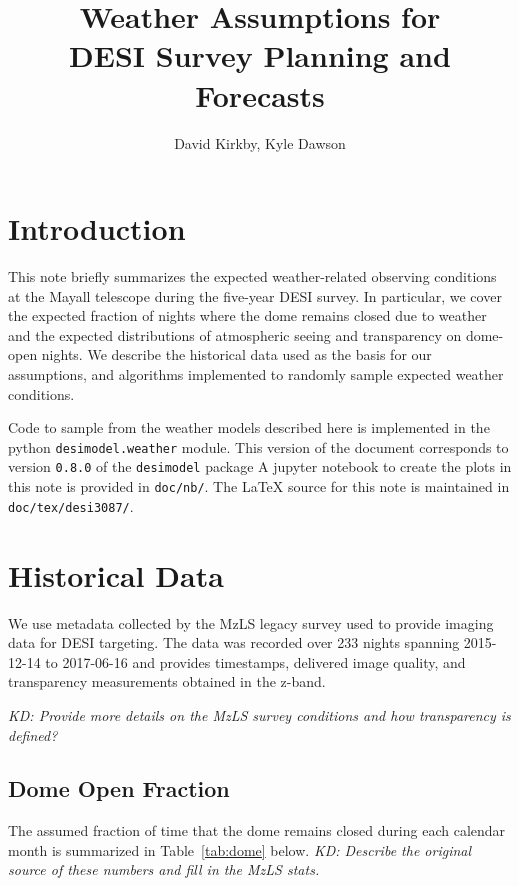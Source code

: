 \documentclass[12pt]{article}
\title{Weather Assumptions for\\
DESI Survey Planning and Forecasts\\
\vspace{5mm}{\large\bf DESI-doc-3087-v1}}
\author{David Kirkby, Kyle Dawson}
\providecommand{\tab}[1]{Table~\ref{tab:#1}}
\begin{document}
\maketitle

\section{Introduction}

This note briefly summarizes the expected weather-related observing conditions at the Mayall telescope during the five-year DESI survey.  In particular, we cover the expected fraction of nights where the dome remains closed due to weather and the expected distributions of atmospheric seeing and transparency on dome-open nights.  We describe the historical data used as the basis for our assumptions, and algorithms implemented to randomly sample expected weather conditions.

Code to sample from the weather models described here is implemented in the
python {\tt desimodel.weather} module.  This version of the document corresponds
to version {\tt 0.8.0} of the {\tt desimodel} package A jupyter notebook to create the plots in this note is provided in {\tt doc/nb/}.  The LaTeX source for this note is maintained in {\tt doc/tex/desi3087/}.

\section{Historical Data}

We use metadata collected by the MzLS legacy survey\cite{desi-2947} used to provide imaging data for DESI targeting.  The data was recorded over 233 nights spanning 2015-12-14 to 2017-06-16 and provides timestamps, delivered image quality, and transparency measurements obtained in the z-band.

{\em KD: Provide more details on the MzLS survey conditions and how transparency is defined?}

\subsection{Dome Open Fraction}

The assumed fraction of time that the dome remains closed during each calendar month is summarized in \tab{dome} below. {\em KD: Describe the original source of these numbers and fill in the MzLS stats.}
\end{document}
